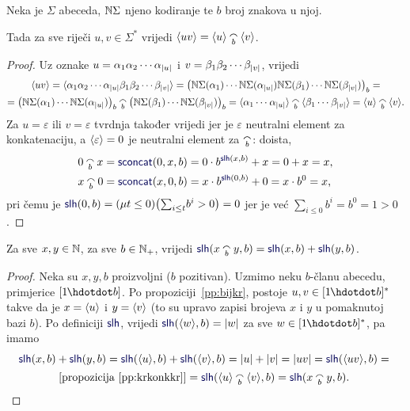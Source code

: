 \begin{propozicija}[{name=[prateća funkcija konkatenacije nad $\Sigma$]}]\label{pp:krkonkkr}
Neka je $\Sigma$ abeceda, ${\mathbb N}\Sigma$ njeno kodiranje te $b$ broj znakova u njoj.
	
	Tada za sve riječi $u,v\in\Sigma^*$ vrijedi
    $\kr{uv}=\kr u\conc b\kr v$.
\end{propozicija}
\begin{proof}
Uz oznake $u=\alpha_1\alpha_2\dotsm\alpha_{\lvert u\rvert}$ i $v=\beta_1\beta_2\dotsm\beta_{\lvert v\rvert}$, vrijedi
\begin{multline*}
\kr{uv}=\kr{\alpha_1\alpha_2\dotsm\alpha_{\dulj u}\beta_1\beta_2\dotsm\beta_{\dulj v}}=\bigl(
\N\Sigma(\alpha_1)
\dotsm
\N\Sigma(\alpha_{\dulj u})
\N\Sigma(\beta_1)
\dotsm
\N\Sigma(\beta_{\dulj v})
\bigr)_b=\\
=\bigl(
\N\Sigma(\alpha_1)
\dotsm
\N\Sigma(\alpha_{\dulj u})
\bigr)_b\conc b\bigl(
\N\Sigma(\beta_1)
\dotsm
\N\Sigma(\beta_{\dulj v})
\bigr)_b=\kr{\alpha_1\dotsm\mspace{1mu}\alpha_{\dulj u}}\conc b\kr{\beta_1\dotsm\mspace{1mu}\beta_{\dulj v}}=\kr u\conc b\kr v\text.
\end{multline*}
Za $u=\varepsilon$ ili $v=\varepsilon$ tvrdnja također vrijedi jer je $\varepsilon$ neutralni element za konkatenaciju, a $\langle\varepsilon\rangle=0$ je neutralni element za $\conc b$: doista,
\begin{align}
    0\conc bx&=\f{sconcat}(0,x,b)=0\cdot b^{\f{slh}(x,b)}+x=0+x=x\text,\\
    x\conc b0&=\f{sconcat}(x,0,b)=x\cdot b^{\f{slh}(0,b)}+0=x\cdot b^0=x\text,
\end{align}
pri čemu je $\f{slh}(0,b)=(\mu t\le 0)\bigl(\sum_{i\le t}\!b^i>0\bigr)=0$ jer je već $\sum_{i\le0}b^i=b^0=1>0$.
\end{proof}

\begin{korolar}[{name=[duljina konkatenacije je zbroj duljina]}]\label{kor:lhkonk=lh+lh}
Za sve $x,y\in{\mathbb N}$, za sve $b\in{\mathbb N}_+$, vrijedi $\f{slh}(x\conc b y,b)=\f{slh}(x,b)+\f{slh}(y,b)$.
\end{korolar}
\begin{proof}
	Neka su $x,y,b$ proizvoljni ($b$ pozitivan). Uzmimo neku $b$-članu abecedu, primjerice $[1\mspace{-1mu}\dd b]$.
	Po propoziciji~\ref{pp:bijkr}, postoje $u,v\in[1\mspace{-1mu}\dd b]^*$ takve da je $x=\langle u\rangle$ i $y=\langle v\rangle$ (to su upravo zapisi brojeva $x$ i $y$ u pomaknutoj bazi $b$). Po definiciji $\f{slh}$, vrijedi $\f{slh}(\kr w,b)=\dulj w$ za sve $w\in[1\mspace{-1mu}\dd b]^*$, pa imamo
\begin{multline}
    \f{slh}(x,b)+\f{slh}(y,b)=
    \f{slh}(\kr u,b)+\f{slh}(\kr v,b)=
    \dulj u+\dulj v=
    \dulj{uv}=
    \f{slh}(\kr{uv},b)={}\\
    \text{[propozicija \ref{pp:krkonkkr}]}{}=\f{slh}(\kr u\conc b\kr v,b)=
    \f{slh}(x\conc b y,b)\text{.\;\qedhere}
\end{multline}
\end{proof}

